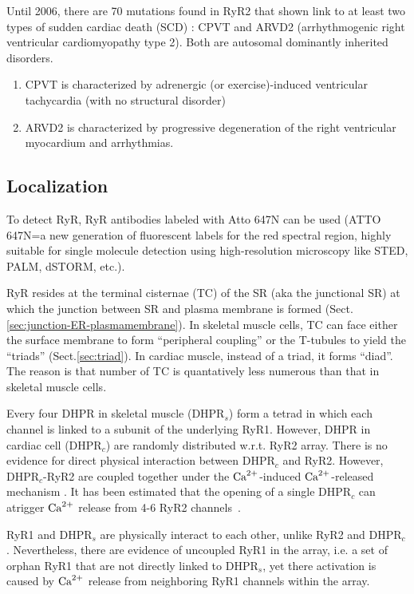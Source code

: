 Until 2006, there are 70 mutations found in RyR2 that shown link to at least two
types of sudden cardiac death (SCD) \citep{thomas2006}: CPVT and ARVD2
(arrhythmogenic right ventricular cardiomyopathy type 2). Both are
autosomal dominantly inherited disorders.
\begin{enumerate}
  \item CPVT is characterized by adrenergic (or exercise)-induced ventricular
  tachycardia (with no structural disorder)
  \item ARVD2 is characterized by progressive degeneration of the right
  ventricular myocardium and arrhythmias. 
\end{enumerate} 

\subsection{Localization}
\label{sec:RyR_localization}

To detect RyR,  RyR antibodies labeled with Atto 647N can be used (ATTO 647N=a
new generation of fluorescent labels for the red spectral region, highly
suitable for single molecule detection using high-resolution microscopy like
STED, PALM, dSTORM, etc.).

RyR resides at the terminal cisternae (TC) of the SR (aka the junctional SR) at
which the junction between SR and plasma membrane is formed
(Sect.\ref{sec:junction-ER-plasmamembrane}).
In skeletal muscle cells, TC can face either the surface membrane to form
``peripheral coupling'' or the T-tubules to yield the ``triads''
(Sect.\ref{sec:triad}). In cardiac muscle, instead of a triad, it forms
``diad''. The reason is that number of TC is quantatively less numerous than
that in skeletal muscle cells.

Every four DHPR in skeletal muscle (DHPR$_s$) form a tetrad in which each
channel is linked to a subunit of the underlying RyR1.
However, DHPR in cardiac cell (DHPR$_c$) are randomly distributed w.r.t.
RyR2 array. There is no evidence for direct physical interaction between
DHPR$_c$ and RyR2. However, DHPR$_c$-RyR2 are coupled together under the
${\text{Ca}^{2+}}$-induced ${\text{Ca}^{2+}}$-released mechanism \citep{fabiato1979cir}. It has been
estimated that the opening of a single DHPR$_c$ can atrigger ${\text{Ca}^{2+}}$ release from
4-6 RyR2 channels~\citep{wang2003}.

\begin{framed}
RyR1 and DHPR$_s$ are physically interact to each other, unlike RyR2 and
DHPR$_c$. Nevertheless, there are evidence of uncoupled RyR1 in the array, i.e.
a set of orphan RyR1 that are not directly linked to DHPR$_s$, yet there activation is
caused by ${\text{Ca}^{2+}}$ release from neighboring RyR1 channels within the array.
\end{framed}

